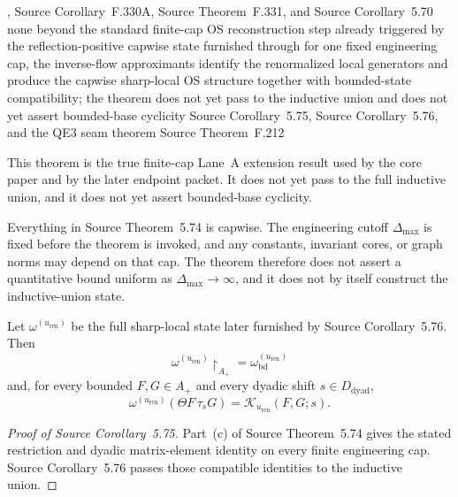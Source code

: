 \dependencyledger
  {, Source Corollary~F.330A, Source Theorem~F.331, and Source Corollary~5.70}
  {none beyond the standard finite-cap OS reconstruction step already triggered by the reflection-positive capwise state furnished through }
  {for one fixed engineering cap, the inverse-flow approximants identify the renormalized local generators and produce the capwise sharp-local OS structure together with bounded-state compatibility; the theorem does not yet pass to the inductive union and does not yet assert bounded-base cyclicity}
  {Source Corollary~5.75, Source Corollary~5.76, and the QE3 seam theorem Source Theorem~F.212}

This theorem is the true finite-cap Lane~A extension result used by the core paper and by the later endpoint packet. It does not yet pass to the full inductive union, and it does not yet assert bounded-base cyclicity.

\begin{remark}
Everything in Source Theorem~5.74 is capwise. The engineering cutoff $\Delta_{\max}$ is fixed before the theorem is invoked, and any constants, invariant cores, or graph norms may depend on that cap. The theorem therefore does not assert a quantitative bound uniform as $\Delta_{\max}\to\infty$, and it does not by itself construct the inductive-union state.
\end{remark}

\begin{corollary}
Let $\omega^{(u_{\mathrm{ren}})}$ be the full sharp-local state later furnished by Source Corollary~5.76. Then
\[
\omega^{(u_{\mathrm{ren}})}\!\restriction_{A_+}=\omega_{\mathrm{bd}}^{(u_{\mathrm{ren}})}
\]
and, for every bounded $F,G\in A_+$ and every dyadic shift $s\in D_{\mathrm{dyad}}$,
\[
\omega^{(u_{\mathrm{ren}})}(\Theta F\,\tau_s G)=\mathcal K_{u_{\mathrm{ren}}}(F,G;s).
\]
\end{corollary}

\begin{proof}[Proof of Source Corollary~5.75]
Part~(c) of Source Theorem~5.74 gives the stated restriction and dyadic matrix-element identity on every finite engineering cap. Source Corollary~5.76 passes those compatible identities to the inductive union.
\end{proof}

